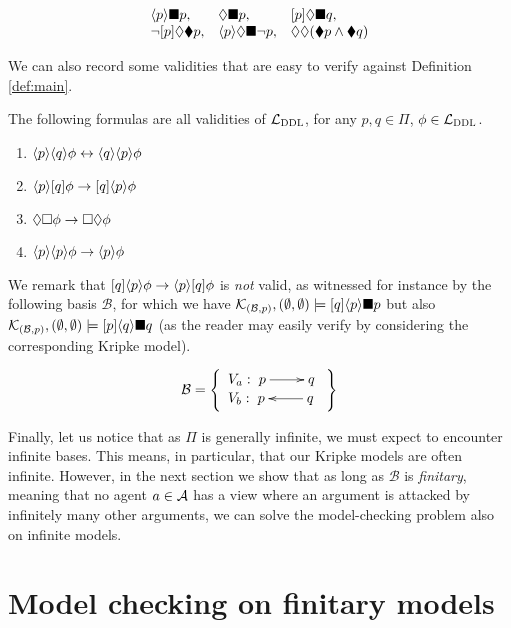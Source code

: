 \documentclass{llncs}
\newcommand{\dlangm}{{\mathcal L}_{\acro{DDL}}}
\newcommand{\kmod}[2]{{\cal K}_{(#1,#2)}}
\newcommand{\views}{\mathcal B}
\begin{document}
$$
\begin{array}{lll}
\langle{p}\rangle \blacksquare p, & \lozenge \blacksquare p, & [p] \lozenge \blacksquare q, \\
\neg [p] \lozenge \blacklozenge p, & \langle{p}\rangle \lozenge \blacksquare \neg p, & \lozenge \lozenge (\blacklozenge p \land \blacklozenge q)
\end{array}
$$

We can also record some validities that are easy to verify against Definition \ref{def:main}. 

\begin{proposition}\label{prop:val}
The following formulas are all validities of $\dlangm$, for any $p,q \in \Pi$, $\phi \in \dlangm$. \begin{enumerate}
\item $\langle{p}\rangle \langle{q}\rangle \phi \leftrightarrow \langle{q}\rangle \langle{p}\rangle \phi$
\item $\langle{p}\rangle [q] \phi \to [q] \langle{p}\rangle \phi$
\item $\lozenge \square \phi \to \square \lozenge \phi$
\item $\langle{p}\rangle \langle{p}\rangle \phi \to \langle{p}\rangle \phi$ 
\end{enumerate}
\end{proposition}

We remark that $[q] \langle{p}\rangle \phi \to \langle{p}\rangle [q] \phi$ is \emph{not} valid, as witnessed for instance by the following basis $\views$, for which we have $\kmod \views p, (\emptyset,\emptyset) \models \dbox q \ddia p \cbox p$ but also $\kmod \views p, (\emptyset,\emptyset) \models \dbox p \ddia q \cbox q$ (as the reader may easily verify by considering the corresponding Kripke model).

$$
\views = \left\{\begin{array}{ll}V_a: \xymatrix{p \ar[r] & q} \\ V_b: \xymatrix{p & q \ar[l]} \end{array}\right\}$$

Finally, let us notice that as $\Pi$ is generally infinite, we must expect to encounter infinite bases. This means, in particular, that our Kripke models are often infinite. However, in the next section we show that as long as $\views$ is \emph{finitary}, meaning that no agent $a \in \mathcal A$ has a view where an argument is attacked by infinitely many other arguments, we can solve the model-checking problem also on infinite models.

\section{Model checking on finitary models}\label{sec:mcheck}
\end{document}
